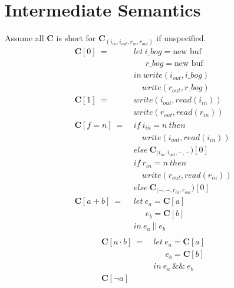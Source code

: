 \documentclass[12pt, letterpaper]{article}
\begin{document}
\section{Intermediate Semantics}
Assume all $\mathbf{C}$ is short for $\mathbf{C}_{(i_{in},i_{out},r_{in},r_{out})}$ if unspecified.
 {\fontsize{12pt}{14pt}\selectfont
     \begin{align*}
         \mathbf{C}[0]\ 
             =\ &
             let\ i\_bog = \text{new buf}\\
             &\quad\ \ r\_bog = \text{new buf}\\
             &in\ write(i_{out}, i\_bog)\\
             &\quad  write(r_{out}, r\_bog)\\
         \mathbf{C}[1]\ 
             =\ &
             write(i_{out}, read(i_{in}))\\
             &write(r_{out}, read(r_{in}))
             \\
         \mathbf{C}[f = n]\
            =\
            &if\ i_{in}=n\ then\\
            &\quad write(i_{out}, read(i_{in}))\\
            &else\ \mathbf{C}_{(i_{in}, i_{out}, -, -})[0]\\
            &if\ r_{in}=n\ then\\
            &\quad write(r_{out}, read(r_{in}))\\
            &else\ \mathbf{C}_{(-, -, r_{in}, r_{out}})[0]\\
         \mathbf{C}[a + b]\ 
             =\ &
             let\ e_a = \mathbf{C}[a]\\
             &\quad\ \ e_b = \mathbf{C}[b]\\
             &in\ e_a\ ||\ e_b\\
    \end{align*}
    \begin{align*}
         \mathbf{C}[a \cdot b]\ 
            =\ &
            let\ e_a = \mathbf{C}[a]\\
            &\quad\ \ e_b = \mathbf{C}[b]\\
            &in\ e_a\ \&\&\ e_b\\
         \mathbf{C}[\neg a]\ 

\end{align*}}
\end{document}
